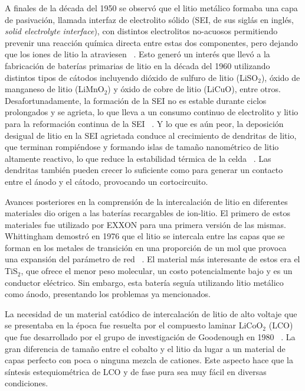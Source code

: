 A finales de la década del 1950 se observó que el litio metálico formaba una capa 
de pasivación, llamada interfaz de electrolito sólido (SEI, de sus siglás en 
inglés, \textit{solid electrolyte interface}), con distintos electrolitos 
no-acuosos permitiendo prevenir una reacción química directa entre estas dos 
componentes, pero dejando que los iones de litio la atraviesen ~\cite{peled1979}. 
Esto generó un interés que llevó a la fabricación de baterías primarias de litio 
en la década del 1960 utilizando distintos tipos de cátodos incluyendo dióxido de 
sulfuro de litio (LiSO$_2$), óxido de manganeso de litio (LiMnO$_2$) y óxido de 
cobre de litio (LiCuO), entre otros. Desafortunadamente, la formación de la SEI 
no es estable durante ciclos prolongados y se agrieta, lo que lleva a un consumo 
continuo de electrolito y litio para la reformación continua de la SEI 
~\cite{besenhard1976}. Y lo que es aún peor, la deposición desigual de litio en 
la SEI agrietada conduce al crecimiento de dendritas de litio, que terminan 
rompiéndose y formando islas de tamaño nanométrico de litio altamente reactivo, 
lo que reduce la estabilidad térmica de la celda ~\cite{yamaki1998}. Las 
dendritas también pueden crecer lo suficiente como para generar un contacto 
entre el ánodo y el cátodo, provocando un cortocircuito. 

Avances posteriores en la comprensión de la intercalación de litio en diferentes
materiales dio origen a las baterías recargables de ion-litio. El primero de 
estos materiales fue utilizado por EXXON para una primera versión de las mismas.
Whittingham demostró en 1976 que el litio se intercala entre las capas que se 
forman en los metales de transición en una proporción de un mol que provoca una
expansión del parámetro de red ~\cite{whittingham1976}. El material más 
interesante de estos era el TiS$_2$, que ofrece el menor peso molecular, un costo 
potencialmente bajo y es un conductor eléctrico. Sin embargo, esta batería seguía
utilizando litio metálico como ánodo, presentando los problemas ya mencionados. 

La necesidad de un material catódico de intercalación de litio de alto voltaje 
que se presentaba en la época fue resuelta por el compuesto laminar LiCoO$_2$ 
(LCO) que fue desarrollado por el grupo de investigación de Goodenough en 1980
~\cite{mizushima1980}. La gran diferencia de tamaño entre el cobalto y el litio 
da lugar a un material de capas perfecto con poca o ninguna mezcla de cationes. 
Este aspecto hace que la síntesis estequiométrica de LCO y de fase pura sea muy 
fácil en diversas condiciones. 

